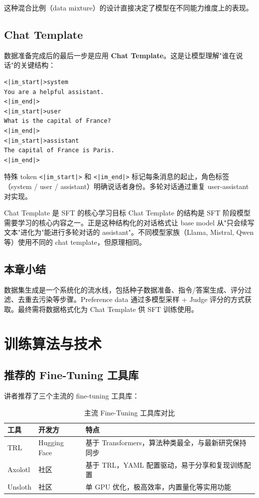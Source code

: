 \documentclass[a4paper]{article}
\begin{document}
这种混合比例（data mixture）的设计直接决定了模型在不同能力维度上的表现。

\subsection{Chat Template}

数据准备完成后的最后一步是应用 \textbf{Chat Template}。这是让模型理解"谁在说话"的关键结构：

\begin{lstlisting}[caption={Chat Template 示例（ChatML 格式）}]
<|im_start|>system
You are a helpful assistant.
<|im_end|>
<|im_start|>user
What is the capital of France?
<|im_end|>
<|im_start|>assistant
The capital of France is Paris.
<|im_end|>
\end{lstlisting}

特殊 token \texttt{<|im\_start|>} 和 \texttt{<|im\_end|>} 标记每条消息的起止，角色标签（system / user / assistant）明确说话者身份。多轮对话通过重复 user-assistant 对实现。

\begin{importantbox}{Chat Template 是 SFT 的核心学习目标}
Chat Template 的结构是 SFT 阶段模型需要学习的核心内容之一。正是这种结构化的对话格式让 base model 从"只会续写文本"进化为"能进行多轮对话的 assistant"。不同模型家族（Llama, Mistral, Qwen 等）使用不同的 chat template，但原理相同。
\end{importantbox}

\subsection{本章小结}

数据集生成是一个系统化的流水线，包括种子数据准备、指令/答案生成、评分过滤、去重去污染等步骤。Preference data 通过多模型采样 + Judge 评分的方式获取。最终需将数据格式化为 Chat Template 供 SFT 训练使用。

\newpage
\section{训练算法与技术}

\subsection{推荐的 Fine-Tuning 工具库}

讲者推荐了三个主流的 fine-tuning 工具库：

\begin{table}[H]
\centering
\caption{主流 Fine-Tuning 工具库对比}
\begin{tabular}{llp{7cm}}
\toprule
\textbf{工具} & \textbf{开发方} & \textbf{特点} \\
\midrule
TRL & Hugging Face & 基于 Transformers，算法种类最全，与最新研究保持同步 \\
Axolotl & 社区 & 基于 TRL，YAML 配置驱动，易于分享和复现训练配置 \\
Unsloth & 社区 & 单 GPU 优化，极高效率，内置量化等实用功能 \\
\bottomrule
\end{tabular}
\end{table}
\end{document}
